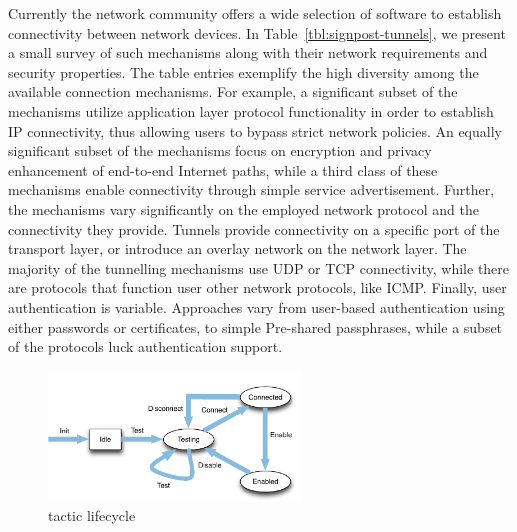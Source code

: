 Currently the network community offers a wide selection of software to establish
connectivity between network devices. In Table~\ref{tbl:signpost-tunnels}, we
present a small survey of such mechanisms along with their network requirements
and security properties.  The table entries exemplify the high diversity among
the available connection mechanisms.  For example, a significant subset of the
mechanisms utilize application layer protocol functionality in order to establish
IP connectivity, thus allowing users to bypass strict network policies. An
equally significant subset of the mechanisms focus on encryption and privacy
enhancement of end-to-end Internet paths, while a third class of these
mechanisms enable connectivity through simple service advertisement. Further,
the mechanisms vary significantly on the employed network protocol and the 
connectivity they provide.  Tunnels provide connectivity on a specific port of
the transport layer, or introduce an overlay network on the network layer.  The
majority of the tunnelling mechanisms use UDP or TCP connectivity, while
there are protocols that function user other network protocols, like ICMP.
Finally, user authentication is variable.  Approaches vary from
user-based authentication using either passwords or certificates, to simple
Pre-shared passphrases, while a subset of the protocols luck authentication support. 

\begin{figure}
  \begin{center}
	\includegraphics[width=0.6\textwidth]{signpost-tactic}
  \end{center}
  \caption{\signpost tactic lifecycle}
  \label{fig:signpost-tactic}
\end{figure}

